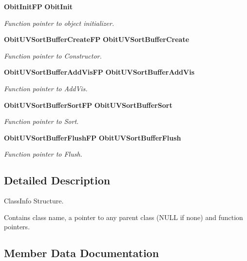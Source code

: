 \begin{CompactItemize}
{\bf Obit\-Init\-FP} {\bf Obit\-Init}
\begin{CompactList}\small\item\em Function pointer to object initializer. \item\end{CompactList}\item 
{\bf Obit\-UVSort\-Buffer\-Create\-FP} {\bf Obit\-UVSort\-Buffer\-Create}
\begin{CompactList}\small\item\em Function pointer to Constructor. \item\end{CompactList}\item 
{\bf Obit\-UVSort\-Buffer\-Add\-Vis\-FP} {\bf Obit\-UVSort\-Buffer\-Add\-Vis}
\begin{CompactList}\small\item\em Function pointer to Add\-Vis. \item\end{CompactList}\item 
{\bf Obit\-UVSort\-Buffer\-Sort\-FP} {\bf Obit\-UVSort\-Buffer\-Sort}
\begin{CompactList}\small\item\em Function pointer to Sort. \item\end{CompactList}\item 
{\bf Obit\-UVSort\-Buffer\-Flush\-FP} {\bf Obit\-UVSort\-Buffer\-Flush}
\begin{CompactList}\small\item\em Function pointer to Flush. \item\end{CompactList}\end{CompactItemize}


\subsection{Detailed Description}
Class\-Info Structure. 

Contains class name, a pointer to any parent class (NULL if none) and function pointers. 



\subsection{Member Data Documentation}
